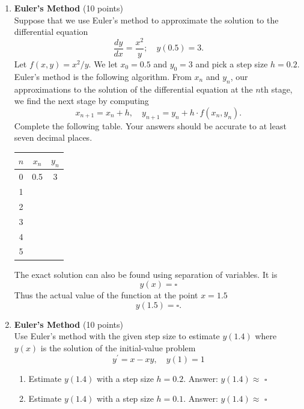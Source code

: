 \begin{enumerate}
  \item \textbf{Euler's Method} (10 points)\\
  Suppose that we use Euler's method to approximate the solution to the differential equation
  $$
  \frac{d y}{d x}=\frac{x^2}{y} ; \quad y(0.5)=3 .
  $$
  Let $f(x, y)=x^2 / y$.
  We let $x_0=0.5$ and $y_0=3$ and pick a step size $h=0.2$. Euler's method is the following algorithm. From $x_n$ and $y_n$, our approximations to the solution of the differential equation at the $n$th stage, we find the next stage by computing
  $$
  x_{n+1}=x_n+h, \quad y_{n+1}=y_n+h \cdot f\left(x_n, y_n\right) .
  $$
  Complete the following table. Your answers should be accurate to at least seven decimal places.
  \begin{tabular}{|c|c|c|}
  \hline $n$ & $x_n$ & $y_n$ \\
  \hline 0 & 0.5 & 3 \\
  \hline 1 & & \\
  \hline 2 & & \\
  \hline 3 & & \\
  \hline 4 & & \\
  \hline 5 & & \\
  \hline
  \end{tabular}
  The exact solution can also be found using separation of variables. It is
  $$
  y(x)=\square
  $$
  Thus the actual value of the function at the point $x=1.5$
  $$
  y(1.5)=\square.
  $$
  \begin{subanswer}
  \end{subanswer}

  \item \textbf{Euler's Method} (10 points)\\
  Use Euler's method with the given step size to estimate $y(1.4)$ where $y(x)$ is the solution of the initial-value problem
  $$
  y^{\prime}=x-x y, \quad y(1)=1
  $$
  \begin{enumerate}[label=(\alph*)]
    \item Estimate $y(1.4)$ with a step size $h=0.2$.
    Answer: $y(1.4) \approx$ $\square$
    \begin{subanswer}
    \end{subanswer}
    \item Estimate $y(1.4)$ with a step size $h=0.1$.
    Answer: $y(1.4) \approx$ $\square$
    \begin{subanswer}
    \end{subanswer}
  \end{enumerate}


\end{enumerate}
